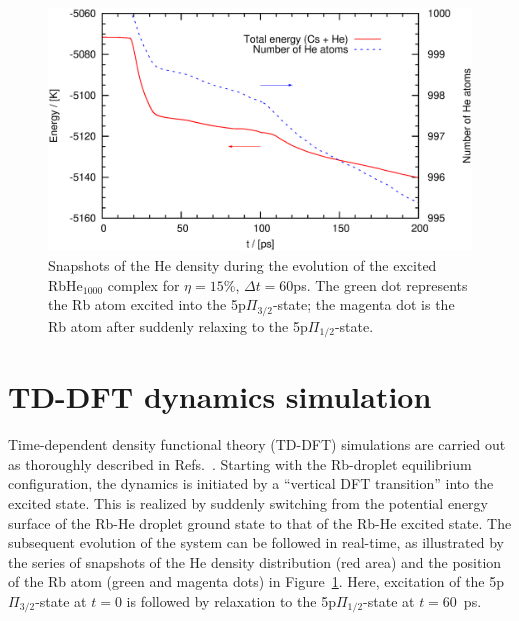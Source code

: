 

\begin{figure}[!]
	\centering
	\includegraphics[width=0.9\linewidth,clip]{fig5}\caption{Snapshots of the He density during the evolution of the excited RbHe$_{1000}$ complex for $\eta=15$\%, $\Delta t=60$ps. The green dot represents the Rb atom excited into the 5p$\Pi_{3/2}$-state; the magenta dot is the Rb atom after suddenly relaxing to the 5p$\Pi_{1/2}$-state.}
	\label{fig:snapshots}
\end{figure}
\section{TD-DFT dynamics simulation}
Time-dependent density functional theory (TD-DFT) simulations are carried out as thoroughly described in Refs.~\cite{Mateo:2013,Ancilotto:2017}. Starting with the Rb-droplet equilibrium configuration, the dynamics is initiated by a ``vertical DFT transition'' into the excited state. This is realized by suddenly switching from the potential energy surface of the Rb-He droplet ground state to that of the Rb-He excited state. The subsequent evolution of the system can be followed in real-time, as illustrated by the series of snapshots of the He density distribution (red area) and the position of the Rb atom (green and magenta dots) in Figure~\ref{fig:snapshots}. Here, excitation of the 5p$\Pi_{3/2}$-state at $t=0$ is followed by relaxation to the 5p$\Pi_{1/2}$-state at $t=60$~ps. 


